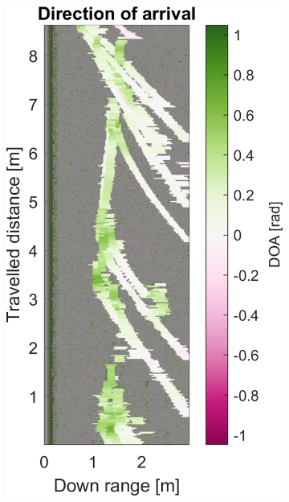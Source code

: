 \begin{figure}[htbp]
\begin{subfigure}[t]{0.475\linewidth}
        \includegraphics[width=\linewidth,max height=.475\textheight]{gfx/results/underground_doa.png}
    \end{subfigure}%
    \hfill%
    \begin{subfigure}[t]{0.475\linewidth}   
        \centering 

\end{subfigure}
\end{figure}
